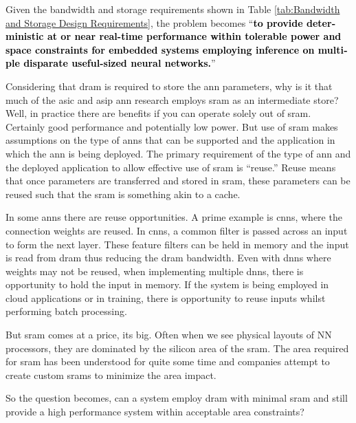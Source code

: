Given the bandwidth and storage requirements shown in Table \ref{tab:Bandwidth and Storage Design Requirements}, 
the problem becomes \hyphenquote{american}{\textbf{\textcolor{black}{to provide deterministic at or near real-time performance within tolerable power and space constraints for embedded systems employing inference on multiple disparate useful-sized neural networks.}}}

\iffalse
Considering that \ac{dram} is required to store the \ac{ann} parameters, why is it that much of the \ac{asic} and \ac{asip} \ac{ann} research employs \ac{sram} as an intermediate store? Well, in practice there are benefits if you can operate solely out of \ac{sram}.
Certainly good performance and potentially low power.
But use of \ac{sram} makes assumptions on the type of \acp{ann} that can be supported and the application in which the \ac{ann} is being deployed.
The primary requirement of the type of \ac{ann} and the deployed application to allow effective use of \ac{sram} is ``reuse.'' Reuse means that once parameters are transferred and stored in \ac{sram}, these parameters can be reused such that the \ac{sram} \iffalse isn't simply an intermediate memory but \fi is something akin to a cache.

In some \ac{ann}s there are reuse opportunities. A prime example is \acp{cnn}, where the connection weights are reused. In \acp{cnn}, a common filter is passed across an input to form the next layer. These feature filters can be held in memory and the input is read from \ac{dram} thus reducing the \ac{dram} bandwidth.
Even with \ac{dnn}s where weights may not be reused, when implementing multiple \ac{dnn}s, there is opportunity to hold the input in memory.
If the system is being employed in cloud applications or in training, there is opportunity to reuse inputs whilst performing batch processing.

But \ac{sram} comes at a price, its big. Often when we see physical layouts of NN processors, they are dominated by the silicon area of the \ac{sram}. The area required for \ac{sram} has been understood for quite some time and companies attempt to create custom \acp{sram} to minimize the area impact.

So the question becomes, can a system employ \ac{dram} with minimal \ac{sram} and still provide a high performance system within acceptable area constraints?

\iffalse
We believe a system can be designed with \ac{dram} as the primary processing store. This will require careful use of data structures to describe storage within \ac{dram} to ensure we make good use of the potential bandwidth. But there are other benefits we will take advantage of, but more about that later.
\fi

